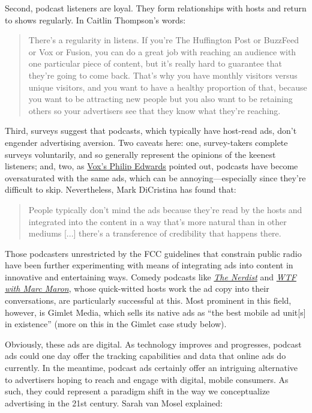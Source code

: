 \documentclass[notoc, symmetric, nobib, nols]{towcenter-guideto-book}
\begin{document}
Second, podcast listeners are loyal. They form relationships with hosts and return to shows regularly. In Caitlin Thompson's words: 

\begin{quote}
There's a regularity in listens. If you're The Huffington Post or BuzzFeed or Vox or Fusion, you can do a great job with reaching an audience with one particular piece of content, but it's really hard to guarantee that they're going to come back. That's why you have monthly visitors versus unique visitors, and you want to have a healthy proportion of that, because you want to be attracting new people but you also want to be retaining others so your advertisers see that they know what they're reaching.\autocite{thompson} 
\end{quote}

Third, surveys suggest that podcasts, which typically have host-read ads, don't engender advertising aversion.\autocite{wolfdenraphael} Two caveats here: one, survey-takers complete surveys voluntarily, and so generally represent the opinions of the keenest listeners; and, two, as \href{http://www.vox.com/2015/9/28/9408375/podcast-ads}{Vox's Philip Edwards} pointed out, podcasts have become oversaturated with the same ads, which can be annoying---especially since they're difficult to skip.\autocite{voxphil} Nevertheless, Mark DiCristina has found that: 

\begin{quote}
People typically don't mind the ads because they're read by the hosts and integrated into the content in a way that's more natural than in other mediums [...] there's a transference of credibility that happens there.\autocite{mailchimp}
\end{quote}

Those podcasters unrestricted by the FCC guidelines that constrain public radio have been further experimenting with means of integrating ads into content in innovative and entertaining ways. Comedy podcasts like \href{http://nerdist.com/podcasts/nerdist-podcast-channel/}\textit{The Nerdist} and \textit{\href{http://www.wtfpod.com}{WTF with Marc Maron}}, whose quick-witted hosts work the ad copy into their conversations, are particularly successful at this. Most prominent in this field, however, is Gimlet Media, which sells its native ads as ``the best mobile ad unit[s] in existence'' (more on this in the Gimlet case study below).\autocite{lieber}

Obviously, these ads are digital. As technology improves and progresses, podcast ads could one day offer the tracking capabilities and data that online ads do currently. In the meantime, podcast ads certainly offer an intriguing alternative to advertisers hoping to reach and engage with digital, mobile consumers. As such, they could represent a paradigm shift in the way we conceptualize advertising in the 21st century. Sarah van Mosel explained: 
\end{document}
